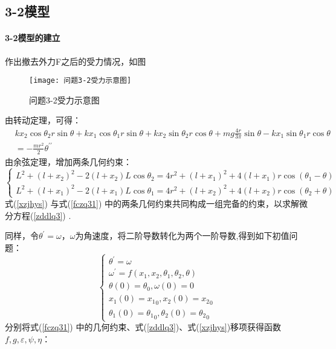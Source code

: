 \documentclass[withoutpreface,bwprint]{cumcmthesis} %
\begin{document}
	\subsection{3-2模型}
	\paragraph{3-2模型的建立}
	作出撤去外力F之后的受力情况，如图
 	\begin{figure}[H]
		\centering
		\texttt{[image: 问题3-2受力示意图]}
		\caption{问题3-2受力示意图}
		\label{问题3-2受力示意图}
	\end{figure}
	由转动定理，可得：
	\begin{equation}\label{zddlq3}
	\begin{aligned}
	&k x_{2} \cos \theta_{2} r \sin \theta+k x_{1} \cos \theta_{1} r \sin \theta+k x_{2} \sin \theta_{2} r \cos \theta+m g \frac{4 r}{3 \pi} \sin \theta-k x_{1} \sin \theta_{1} r \cos \theta \\
	&=-\frac{m r^{2}}{2} \theta^{\prime \prime}
	\end{aligned}
	\end{equation}
	由余弦定理，增加两条几何约束：
	\begin{equation}\label{xzjhys}
	\left\{\begin{array}{l}
	L^{2}+\left(l+x_{2}\right)^{2}-2\left(l+x_{2}\right) L \cos \theta_{2}=4 r^{2}+\left(l+x_{1}\right)^{2}+4\left(l+x_{1}\right) r \cos \left(\theta_{1}-\theta\right) \\
	L^{2}+\left(l+x_{1}\right)^{2}-2\left(l+x_{1}\right) L \cos \theta_{1}=4 r^{2}+\left(l+x_{2}\right)^{2}+4\left(l+x_{2}\right) r \cos \left(\theta_{2}+\theta\right) 
	\end{array}\right.
	\end{equation}
	式(\ref{xzjhys}) 与式(\ref{fczq31}) 中的两条几何约束共同构成一组完备的约束，以求解微分方程(\ref{zddlq3}) .

	同样，令$\theta^{\prime}=\omega$，$\omega$为角速度，将二阶导数转化为两个一阶导数,得到如下初值问题：
	\begin{equation}\label{wfdsfc}
	\left\{\begin{array}{l}
	
	\theta^{\prime}=\omega \\
	\omega^{\prime}=f\left(x_{1}, x_{2}, \theta_{1}, \theta_{2}, \theta\right)\\
	\theta(0)=\theta_0,\omega(0)=0\\
	x_1(0)={x_1}_0, x_2(0)={x_2}_0\\ 
	\theta_1(0)={\theta_1}_0,\theta_2(0)={\theta_2}_0
	
	\end{array}\right.
	\end{equation}
	分别将式(\ref{fczq31}) 中的几何约束、式(\ref{zddlq3})、式(\ref{xzjhys})移项获得函数$f,g,\varepsilon,\psi,\eta$：
	
\end{document}
